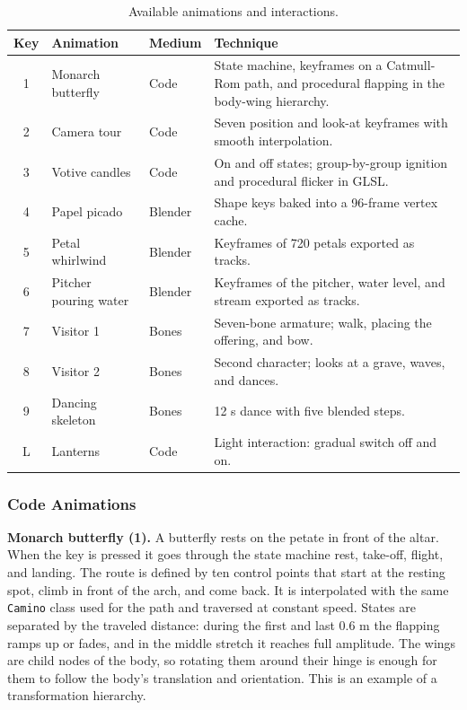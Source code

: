 \documentclass[letter,12pt]{article}
\begin{document}
	\begin{table}[H]
		\centering
		\small
		\begin{tabularx}{\textwidth}{c p{3.3cm} p{2.4cm} X}
			\toprule
			\textbf{Key} & \textbf{Animation} & \textbf{Medium} & \textbf{Technique}\\
			\midrule
			1 & Monarch butterfly & Code & State machine, keyframes on a Catmull-Rom path, and procedural flapping in the body-wing hierarchy. \\
			2 & Camera tour & Code & Seven position and look-at keyframes with smooth interpolation. \\
			3 & Votive candles & Code & On and off states; group-by-group ignition and procedural flicker in GLSL. \\
			4 & Papel picado & Blender & Shape keys baked into a 96-frame vertex cache. \\
			5 & Petal whirlwind & Blender & Keyframes of 720 petals exported as tracks. \\
			6 & Pitcher pouring water & Blender & Keyframes of the pitcher, water level, and stream exported as tracks. \\
			7 & Visitor 1 & Bones & Seven-bone armature; walk, placing the offering, and bow. \\
			8 & Visitor 2 & Bones & Second character; looks at a grave, waves, and dances. \\
			9 & Dancing skeleton & Bones & 12 s dance with five blended steps. \\
			L & Lanterns & Code & Light interaction: gradual switch off and on. \\
			\bottomrule
		\end{tabularx}
		\caption{Available animations and interactions.}
		\label{tab:animations}
	\end{table}

	\subsubsection{Code Animations}
	\textbf{Monarch butterfly (1).} A butterfly rests on the petate in front of the altar. When the key is pressed it goes through the state machine rest, take-off, flight, and landing. The route is defined by ten control points that start at the resting spot, climb in front of the arch, and come back. It is interpolated with the same \texttt{Camino} class used for the path and traversed at constant speed. States are separated by the traveled distance: during the first and last 0.6 m the flapping ramps up or fades, and in the middle stretch it reaches full amplitude. The wings are child nodes of the body, so rotating them around their hinge is enough for them to follow the body's translation and orientation. This is an example of a transformation hierarchy.
\end{document}
